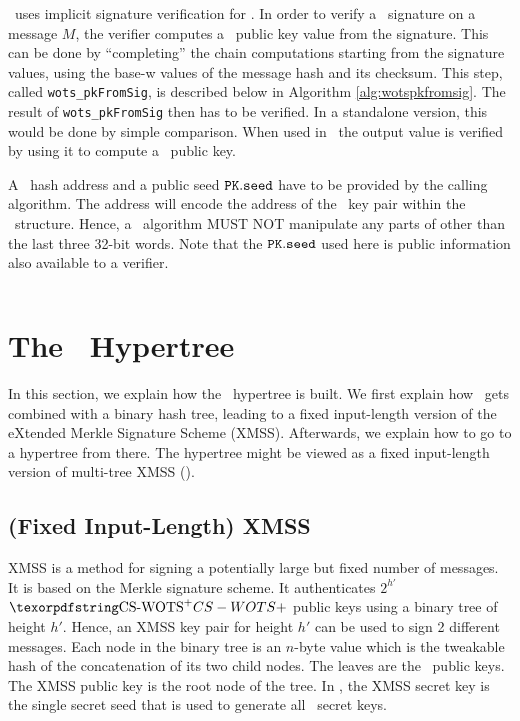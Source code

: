 \SPHINCSA\ uses implicit signature verification for \WOTSCS. In order to verify a \WOTSCS\ signature \sig on a message $M$, the verifier computes a \WOTSCS\ public key value from the signature. This can be done by ``completing'' the chain computations starting from the signature values, using the base-w values of the message hash and its checksum. This step, called \texttt{wots\_pkFromSig}, is described below in Algorithm \ref{alg:wotspkfromsig}. The result of \texttt{wots\_pkFromSig} then has to be verified. In a standalone version, this would be done by simple comparison. When used in \SPHINCSA\ the output value is verified by using it to compute a \SPHINCSA\ public key. 

A \WOTSCS\ hash address \ADRS and a public seed $\pk.\seed$ have to be provided by the calling algorithm. The address will encode the address of the \WOTSCS\ key pair within the \SPHINCSA\ structure. Hence, a \WOTSCS\ algorithm MUST NOT manipulate any parts of \ADRS other than the last three 32-bit words. Note that the $\pk.\seed$ used here is public information also available to a verifier.

\begin{algorithm}
\inputminted[breaklines,linenos,tabsize=2,mathescape,escapeinside=||]{C}{paper/code/wots_pkFromSig.cs}
\caption{\texttt{wots\_pkFromSig} --- Computing a \WOTSCS\ public key from a message and its signature.}
\label{alg:wotspkfromsig}
\end{algorithm}


\section{The \SPHINCSA\ Hypertree}
\label{sec:hypertree}

In this section, we explain how the \SPHINCSA\ hypertree is built. We first explain how \WOTSCS\ gets combined with a binary hash tree, leading to a fixed input-length version of the eXtended Merkle Signature Scheme (XMSS). Afterwards, we explain how to go to a hypertree from there. The hypertree might be viewed as a fixed input-length version of multi-tree XMSS (\XMSSMT).


\subsection{(Fixed Input-Length) XMSS} \label{sec:xmss}

XMSS is a method for signing a potentially large but fixed number of messages. It is based on the Merkle signature scheme. It authenticates $2^{h'}$ $\WOTSCS$ public keys using a binary tree of height $h'$. Hence, an XMSS key pair for height $h'$ can be used to sign 2 different messages. Each node in the binary tree is an $n$-byte value which is the tweakable hash of the concatenation of its two child nodes. The leaves are the \WOTSCS\ public keys. The XMSS public key is the root node of the tree. In \SPHINCSA, the XMSS secret key is the single secret seed that is used to generate all \WOTSCS\ secret keys.

